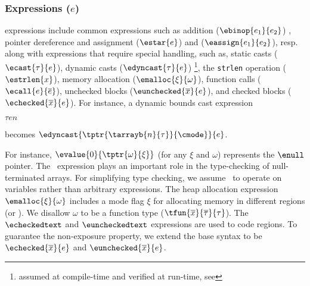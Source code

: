 \subsubsection{Expressions ($e$)}
\lang expressions include common expressions such as addition ($\ebinop{e_1}{e_2}$)
, pointer dereference and assignment ($\estar{e}$) and ($\eassign{e_1}{e_2}$), resp.
along with expressions that require special handling, such as,
 static casts ($\ecast{\tau}{e}$), dynamic casts ($\edyncast{\tau}{e}$) \footnote{assumed at compile-time and verified at run-time, see }, the \texttt{strlen} operation ($\estrlen{x}$),
memory allocation ($\emalloc{\xi}{\omega}$), 
function calls ($\ecall{e}{\overline{e}}$),
unchecked blocks ($\eunchecked{\overline{x}}{e}$), and checked blocks ($\echecked{\overline{x}}{e}$).
For instance, a dynamic bounds cast expression
\begin{center}
  {\footnotesize
    $\tau$\code{>>(}$e$$n$\code{))} }
\end{center}
becomes 
{\footnotesize$\edyncast{\tptr{\tarrayb{n}{\tau}}{\cmode}}{e}$}. 
% 

% 
For instance, $\evalue{0}{\tptr{\omega}{\xi}}$ (for any $\xi$ and $\omega$) represents the $\enull$ pointer.
The~ expression plays an important role in the type-checking of null-terminated arrays.
For simplifying type checking, we assume~ to operate on variables  rather than arbitrary expressions.
% 
The heap allocation expression $\emalloc{\xi}{\omega}$ includes a mode flag $\xi$ for allocating memory in different regions (\cregion or \ucregion).
We disallow $\omega$ to be a function type ($\tfun{\overline{x}}{\overline{\tau}}{\tau}$).
The $\echeckedtext$ and $\euncheckedtext$ expressions are used to
  code regions.
To guarantee the non-exposure property, we extend the base syntax to be $\echecked{\overline{x}}{e}$ and $\eunchecked{\overline{x}}{e}$.
% 

